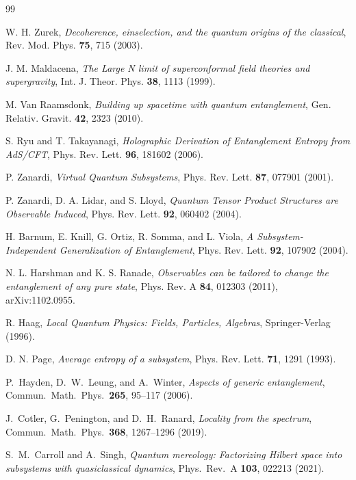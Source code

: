 \documentclass[12pt,a4paper]{article}
\begin{document}
\begin{thebibliography}{99}

W. H. Zurek, \emph{Decoherence, einselection, and the quantum origins of the classical}, Rev. Mod. Phys. \textbf{75}, 715 (2003).

J. M. Maldacena, \emph{The Large N limit of superconformal field theories and supergravity}, Int. J. Theor. Phys. \textbf{38}, 1113 (1999).

M. Van Raamsdonk, \emph{Building up spacetime with quantum entanglement}, Gen. Relativ. Gravit. \textbf{42}, 2323 (2010).

S. Ryu and T. Takayanagi, \emph{Holographic Derivation of Entanglement Entropy from AdS/CFT}, Phys. Rev. Lett. \textbf{96}, 181602 (2006).

P. Zanardi, \emph{Virtual Quantum Subsystems}, Phys. Rev. Lett. \textbf{87}, 077901 (2001).

P. Zanardi, D. A. Lidar, and S. Lloyd, \emph{Quantum Tensor Product Structures are Observable Induced}, Phys. Rev. Lett. \textbf{92}, 060402 (2004).

H. Barnum, E. Knill, G. Ortiz, R. Somma, and L. Viola, \emph{A Subsystem-Independent Generalization of Entanglement}, Phys. Rev. Lett. \textbf{92}, 107902 (2004).

N. L. Harshman and K. S. Ranade, \emph{Observables can be tailored to change the entanglement of any pure state}, Phys. Rev. A \textbf{84}, 012303 (2011), arXiv:1102.0955.

R. Haag, \emph{Local Quantum Physics: Fields, Particles, Algebras}, Springer-Verlag (1996).

D. N. Page, \emph{Average entropy of a subsystem}, Phys. Rev. Lett. \textbf{71}, 1291 (1993).

P.~Hayden, D.~W.~Leung, and A.~Winter,
\emph{Aspects of generic entanglement},
Commun.\ Math.\ Phys.\ \textbf{265}, 95--117 (2006).

J.~Cotler, G.~Penington, and D.~H.~Ranard,
\emph{Locality from the spectrum},
Commun.\ Math.\ Phys.\ \textbf{368}, 1267--1296 (2019).

S.~M.~Carroll and A.~Singh,
\emph{Quantum mereology: Factorizing Hilbert space into subsystems with quasiclassical dynamics},
Phys.\ Rev.\ A \textbf{103}, 022213 (2021).


\end{thebibliography}
\end{document}

